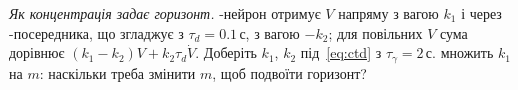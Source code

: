 \begin{exercise}[\lvlC]
\label{ex:05:8}
\emph{Як концентрація задає горизонт.} -нейрон отримує $V$ напряму з вагою $k_1$ і через -посередника, що згладжує з $\tau_d=0.1\,\text{с}$, з вагою $-k_2$; для повільних $V$ сума дорівнює $(k_1-k_2)V+k_2\tau_d\dot V$. Доберіть $k_1$, $k_2$ під~\eqref{eq:ctd} з $\tau_\gamma=2\,\text{с}$.  множить $k_1$ на $m$: наскільки треба змінити $m$, щоб подвоїти горизонт?
\end{exercise}
